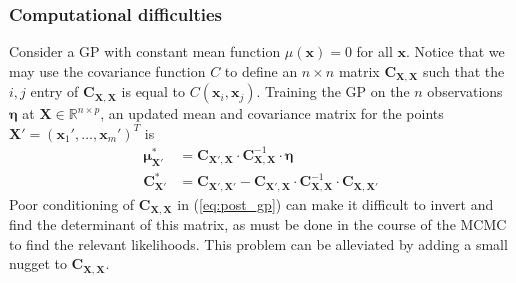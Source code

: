 \documentclass{article}
\begin{document}

\subsubsection{Computational difficulties}
Consider a GP with constant mean function $\mu(\mathbf x)=0$ for all $\mathbf x$. Notice that we may use the covariance function $C$ to define an $n\times n$ matrix $\mathbf C_{\mathbf X,\mathbf X}$ such that the $i,j$ entry of $\mathbf C_{\mathbf X,\mathbf X}$ is equal to $C(\mathbf x_i,\mathbf x_j)$. 
Training the GP on the $n$ observations $\boldsymbol \eta$ at $\mathbf X\in \mathbb R^{n\times p}$, an updated mean and covariance matrix for the points $\mathbf X'=(\mathbf x_1',\ldots,\mathbf x_m')^T$ is 
\begin{equation}\label{eq:post_gp}\begin{split}
\boldsymbol\mu^*_{\mathbf X'}&=\mathbf C_{\mathbf X',\mathbf X}\cdot \mathbf C_{\mathbf X,\mathbf X} ^{-1}\cdot \boldsymbol \eta
\\
\mathbf C^*_{\mathbf X'}&=\mathbf C_{\mathbf X',\mathbf X'}-\mathbf C_{\mathbf X',\mathbf X}\cdot \mathbf C_{\mathbf X,\mathbf X}^{-1}\cdot \mathbf C_{\mathbf X,\mathbf X'}
\end{split}\end{equation}
Poor conditioning of $\mathbf C_{\mathbf X,\mathbf X}$ in (\ref{eq:post_gp}) can make it difficult to invert and find the determinant of this matrix, as must be done in the course of the MCMC to find the relevant likelihoods.
This problem can be alleviated by adding a small nugget to $\mathbf C_{\mathbf X,\mathbf X}$. 
\end{document}
